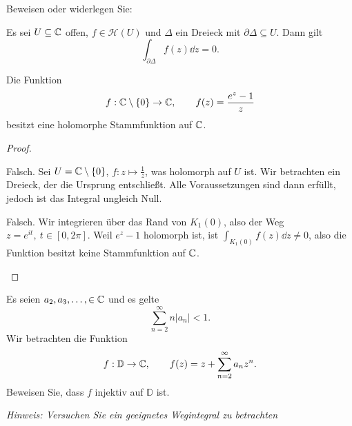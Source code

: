 \begin{Problem}
	Beweisen oder widerlegen Sie:
	\begin{parts}
	\item Es sei $U\subseteq \mathbb{C}$ offen, $f\in \mathcal{H}(U)$ und $\Delta$ ein Dreieck mit $\partial \Delta\subseteq U$. Dann gilt
		\[
		\int_{\partial \Delta} f(z)\dd{z}=0
		.\] 
	\item Die Funktion
		\[
		f:\mathbb{C}\setminus \{0\} \to \mathbb{C},\qquad f(z)=\frac{e^z-1}{z}
		\] 
		besitzt eine holomorphe Stammfunktion auf $\mathbb{C}$.
	\end{parts}
\end{Problem}
\begin{proof}
	\begin{parts}
	\item Falsch. Sei $U=\mathbb{C}\setminus \{0\} $, $f:z\mapsto \frac{1}{z}$, was holomorph auf $U$ ist. Wir betrachten ein Dreieck, der die Ursprung entschließt. Alle Voraussetzungen sind dann erfüllt, jedoch ist das Integral ungleich Null.
	\item Falsch. Wir integrieren über das Rand von $K_1(0)$, also der Weg $z=e^{it},~t\in [0,2\pi]$. Weil $e^z-1$ holomorph ist, ist $\int_{K_1(0)} f(z)\dd{z}\neq 0$, also die Funktion besitzt keine Stammfunktion auf $\mathbb{C}$.\qedhere
	\end{parts}
\end{proof}
\begin{Problem}
	Es seien $a_2,a_3,\dots, \in \mathbb{C}$ und es gelte
	\[
	\sum_{n=2}^\infty n |a_n|<1
	.\] 
	Wir betrachten die Funktion
	\[
	f:\mathbb{D}\to \mathbb{C},\qquad f(z)=z+\sum_{n=2}^\infty a_n z^n
	.\] 
	Beweisen Sie, dass $f$ injektiv auf $\mathbb{D}$ ist.
	
	\emph{Hinweis: Versuchen Sie ein geeignetes Wegintegral zu betrachten}
\end{Problem}

